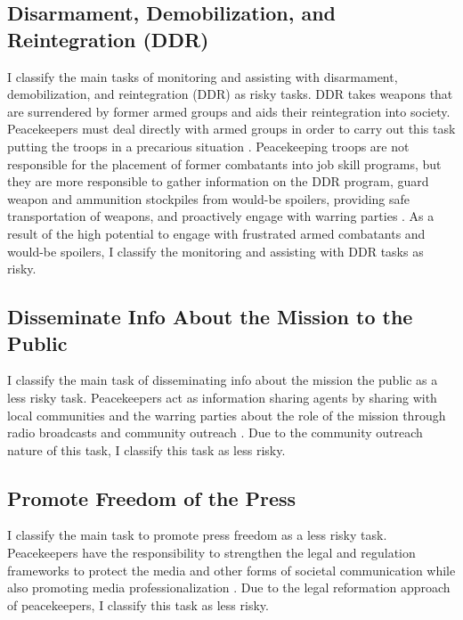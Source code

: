 \subsection*{Disarmament, Demobilization, and Reintegration (DDR)}

I classify the main tasks of monitoring and assisting with disarmament, demobilization, and reintegration (DDR) as risky tasks. DDR takes weapons that are surrendered by former armed groups and aids their reintegration into society. Peacekeepers must deal directly with armed groups in order to carry out this task putting the troops in a precarious situation \citep{DDR}. Peacekeeping troops are not responsible for the placement of former combatants into job skill programs, but they are more responsible to gather information on the DDR program, guard weapon and ammunition stockpiles from would-be spoilers, providing safe transportation of weapons, and proactively engage with warring parties \citep{Infantry_2012}. As a result of the high potential to engage with frustrated armed combatants and would-be spoilers, I classify the monitoring and assisting with DDR tasks as risky. 

\subsection*{Disseminate Info About the Mission to the Public}

I classify the main task of disseminating info about the mission the public as a less risky task. Peacekeepers act as information sharing agents by sharing with local communities and the warring parties about the role of the mission through radio broadcasts and community outreach \citep{TAMM_Codebook}. Due to the community outreach nature of this task, I classify this task as less risky. 

\subsection*{Promote Freedom of the Press}

I classify the main task to promote press freedom as a less risky task. Peacekeepers have the responsibility to strengthen the legal and regulation frameworks to protect the media and other forms of societal communication while also promoting media professionalization \citep{TAMM_Codebook}. Due to the legal reformation approach of peacekeepers, I classify this task as less risky. 